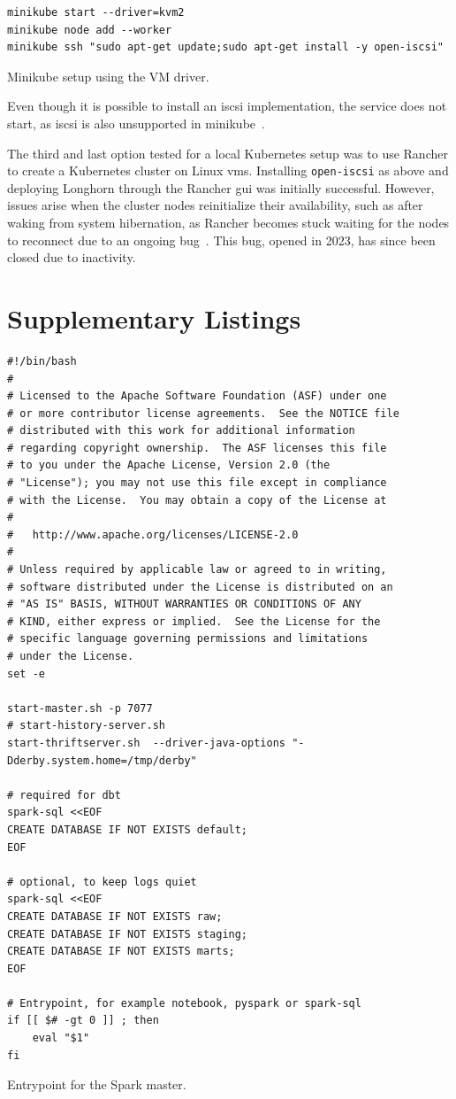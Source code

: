 \begin{listing}[H]
\begin{verbatim}
minikube start --driver=kvm2
minikube node add --worker
minikube ssh "sudo apt-get update;sudo apt-get install -y open-iscsi"
\end{verbatim}
\caption{Minikube setup using the VM driver.}
\label{lst:minikube-setup}
\end{listing}

Even though it is possible to install an \ac{iscsi} implementation, the service does not start, as \ac{iscsi} is also unsupported in minikube~\cite{Deutsch2017}.

The third and last option tested for a local Kubernetes setup was to use Rancher to create a Kubernetes cluster on Linux \acp{vm}.
Installing \texttt{open-iscsi} as above and deploying Longhorn through the Rancher \ac{gui} was initially successful.
However, issues arise when the cluster nodes reinitialize their availability, such as after waking from system hibernation, as Rancher becomes stuck waiting for the nodes to reconnect due to an ongoing bug~\cite{Henkens2023}.
This bug, opened in 2023, has since been closed due to inactivity.


\section{Supplementary Listings}
\label{sec:appendix-listings}

\begin{listing}[H]
\begin{verbatim}
#!/bin/bash
#
# Licensed to the Apache Software Foundation (ASF) under one
# or more contributor license agreements.  See the NOTICE file
# distributed with this work for additional information
# regarding copyright ownership.  The ASF licenses this file
# to you under the Apache License, Version 2.0 (the
# "License"); you may not use this file except in compliance
# with the License.  You may obtain a copy of the License at
#
#   http://www.apache.org/licenses/LICENSE-2.0
#
# Unless required by applicable law or agreed to in writing,
# software distributed under the License is distributed on an
# "AS IS" BASIS, WITHOUT WARRANTIES OR CONDITIONS OF ANY
# KIND, either express or implied.  See the License for the
# specific language governing permissions and limitations
# under the License.
set -e

start-master.sh -p 7077
# start-history-server.sh
start-thriftserver.sh  --driver-java-options "-Dderby.system.home=/tmp/derby"

# required for dbt
spark-sql <<EOF
CREATE DATABASE IF NOT EXISTS default;
EOF

# optional, to keep logs quiet
spark-sql <<EOF
CREATE DATABASE IF NOT EXISTS raw;
CREATE DATABASE IF NOT EXISTS staging;
CREATE DATABASE IF NOT EXISTS marts;
EOF

# Entrypoint, for example notebook, pyspark or spark-sql
if [[ $# -gt 0 ]] ; then
    eval "$1"
fi
\end{verbatim}
\caption{Entrypoint for the Spark master.}
\label{lst:spark-master-entrypoint}
\end{listing}

